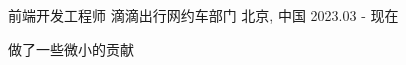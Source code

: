 

\begin{cventries}

  \cventry
    {前端开发工程师} %
    {滴滴出行\hspace{1mm}网约车部门} %
    {北京, 中国} %
    {2023.03 - 现在} %
    {
      \begin{cvitems} %
        \item {做了一些微小的贡献}
      \end{cvitems}
    }

\end{cventries}
